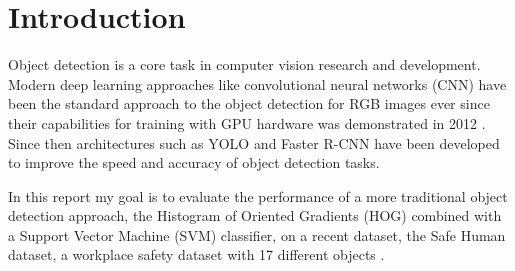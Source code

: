 \section{Introduction}

Object detection is a core task in computer vision research and development. 
Modern deep learning approaches like convolutional neural networks (CNN) have been the standard approach to the object detection for RGB images ever since their capabilities for training with GPU hardware was demonstrated in 2012 \cite{alexnet}.
Since then architectures such as YOLO \cite{yolo} and Faster R-CNN \cite{ren2016fasterrcnnrealtimeobject} have been developed to improve the speed and accuracy of object detection tasks.

In this  report my goal is to evaluate the performance of a more traditional object detection approach, the Histogram of Oriented Gradients (HOG) combined with a Support Vector Machine (SVM) classifier, on a recent dataset, the Safe Human dataset, a workplace safety dataset with 17 different objects \cite{ahmad2024sh17datasethumansafety}.